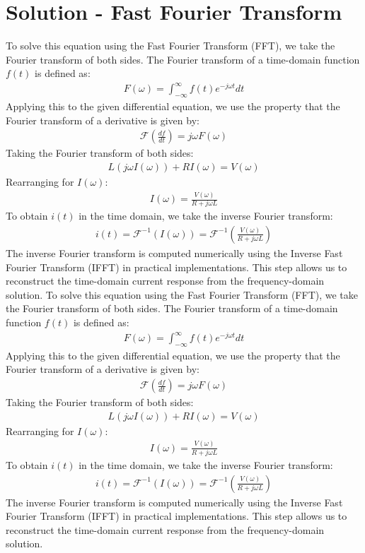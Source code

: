 \section{Solution - Fast Fourier Transform}
To solve this equation using the Fast Fourier Transform (FFT), we take the Fourier transform of both sides. The Fourier transform of a time-domain function $f(t)$ is defined as:
\begin{align}
    F(\omega) = \int_{-\infty}^{\infty} f(t) e^{-j\omega t} dt
\end{align}
Applying this to the given differential equation, we use the property that the Fourier transform of a derivative is given by:
\begin{align}
    \mathcal{F} \left( \frac{df}{dt} \right) = j\omega F(\omega)
\end{align}
Taking the Fourier transform of both sides:
\begin{align}
    L (j\omega I(\omega)) + R I(\omega) = V(\omega)
\end{align}
Rearranging for $I(\omega)$:
\begin{align}
    I(\omega) = \frac{V(\omega)}{R + j\omega L}
\end{align}
To obtain $i(t)$ in the time domain, we take the inverse Fourier transform:
\begin{align}
    i(t) = \mathcal{F}^{-1} \left( I(\omega) \right) = \mathcal{F}^{-1} \left( \frac{V(\omega)}{R + j\omega L} \right)
\end{align}
The inverse Fourier transform is computed numerically using the Inverse Fast Fourier Transform (IFFT) in practical implementations. This step allows us to reconstruct the time-domain current response from the frequency-domain solution.
To solve this equation using the Fast Fourier Transform (FFT), we take the Fourier transform of both sides. The Fourier transform of a time-domain function $f(t)$ is defined as:
\begin{align}
    F(\omega) = \int_{-\infty}^{\infty} f(t) e^{-j\omega t} dt
\end{align}
Applying this to the given differential equation, we use the property that the Fourier transform of a derivative is given by:
\begin{align}
    \mathcal{F} \left( \frac{df}{dt} \right) = j\omega F(\omega)
\end{align}
Taking the Fourier transform of both sides:
\begin{align}
    L (j\omega I(\omega)) + R I(\omega) = V(\omega)
\end{align}
Rearranging for $I(\omega)$:
\begin{align}
    I(\omega) = \frac{V(\omega)}{R + j\omega L}
\end{align}
To obtain $i(t)$ in the time domain, we take the inverse Fourier transform:
\begin{align}
    i(t) = \mathcal{F}^{-1} \left( I(\omega) \right) = \mathcal{F}^{-1} \left( \frac{V(\omega)}{R + j\omega L} \right)
\end{align}
The inverse Fourier transform is computed numerically using the Inverse Fast Fourier Transform (IFFT) in practical implementations. This step allows us to reconstruct the time-domain current response from the frequency-domain solution.
